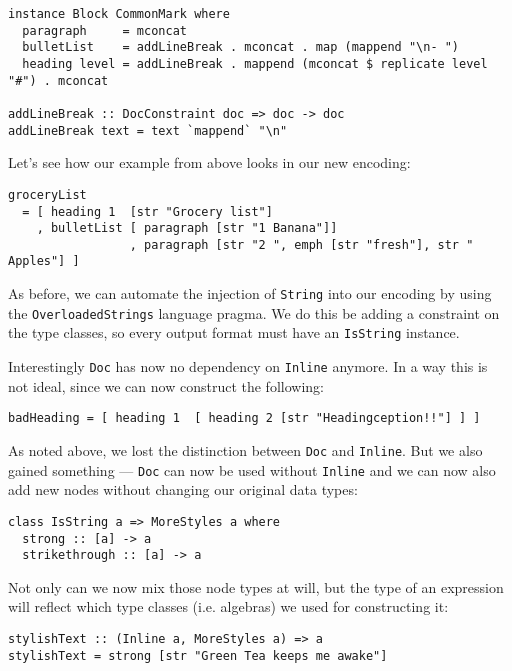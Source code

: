\documentclass[format=acmsmall, review=true, screen=true]{acmart}
\begin{document}
\begin{lstlisting}
instance Block CommonMark where
  paragraph     = mconcat
  bulletList    = addLineBreak . mconcat . map (mappend "\n- ")
  heading level = addLineBreak . mappend (mconcat $ replicate level "#") . mconcat

addLineBreak :: DocConstraint doc => doc -> doc
addLineBreak text = text `mappend` "\n"
\end{lstlisting}

\clearpage

Let's see how our example from above looks in our new encoding:

\begin{lstlisting}
groceryList
  = [ heading 1  [str "Grocery list"]
    , bulletList [ paragraph [str "1 Banana"]]
                 , paragraph [str "2 ", emph [str "fresh"], str " Apples"] ]
\end{lstlisting}


As before, we can automate the injection of \texttt{String} into our encoding by using
the \texttt{OverloadedStrings} language pragma. We do this be adding a constraint on
the type classes, so every output format must have an \texttt{IsString} instance.

Interestingly \texttt{Doc} has now no dependency on \texttt{Inline} anymore. In a way this is
not ideal, since we can now construct the following:

\begin{lstlisting}
badHeading = [ heading 1  [ heading 2 [str "Headingception!!"] ] ]
\end{lstlisting}

As noted above, we lost the distinction between \texttt{Doc} and \texttt{Inline}. But we also
gained something — \texttt{Doc} can now be used without \texttt{Inline} and we can now also
add new nodes without changing our original data types:

\begin{lstlisting}
class IsString a => MoreStyles a where
  strong :: [a] -> a
  strikethrough :: [a] -> a
\end{lstlisting}

Not only can we now mix those node types at will, but the type of an expression
will reflect which type classes (i.e. algebras) we used for constructing it:

\begin{lstlisting}
stylishText :: (Inline a, MoreStyles a) => a
stylishText = strong [str "Green Tea keeps me awake"]
\end{lstlisting}
\end{document}
